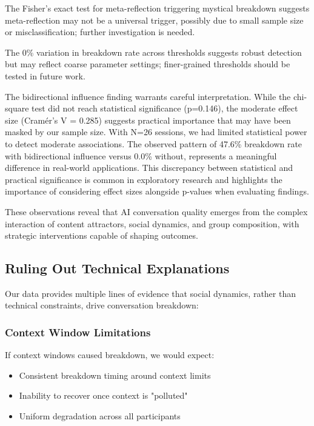 \documentclass[11pt,letterpaper]{article}
\newcommand{\exponedataTotalSessionsRaw}{26}
\newcommand{\exponedataTotalSessions}{N=\exponedataTotalSessionsRaw}
\newcommand{\exponedataBidirectionalPValue}{p=0.146}
\newcommand{\exponedataBidirectionalBreakdownRate}{47.6\%}
\newcommand{\exponedataNonBidirectionalBreakdownRate}{0.0\%}
\begin{document}
The Fisher’s exact test for meta-reflection triggering mystical breakdown suggests meta-reflection may not be a universal trigger, possibly due to small sample size or misclassification; further investigation is needed.

The 0\% variation in breakdown rate across thresholds suggests robust detection but may reflect coarse parameter settings; finer-grained thresholds should be tested in future work.

The bidirectional influence finding warrants careful interpretation. While the chi-square test did not reach statistical significance (\exponedataBidirectionalPValue{}), the moderate effect size (Cramér's V = 0.285) suggests practical importance that may have been masked by our sample size. With \exponedataTotalSessions{} sessions, we had limited statistical power to detect moderate associations. The observed pattern of \exponedataBidirectionalBreakdownRate{} breakdown rate with bidirectional influence versus \exponedataNonBidirectionalBreakdownRate{} without, represents a meaningful difference in real-world applications. This discrepancy between statistical and practical significance is common in exploratory research and highlights the importance of considering effect sizes alongside p-values when evaluating findings.

These observations reveal that AI conversation quality emerges from the complex interaction of content attractors, social dynamics, and group composition, with strategic interventions capable of shaping outcomes.

\subsection{Ruling Out Technical Explanations}

Our data provides multiple lines of evidence that social dynamics, rather than technical constraints, drive conversation breakdown:

\subsubsection{Context Window Limitations}

If context windows caused breakdown, we would expect:
\begin{itemize}
    \item Consistent breakdown timing around context limits
    \item Inability to recover once context is "polluted"
    \item Uniform degradation across all participants
\end{itemize}
\end{document}
